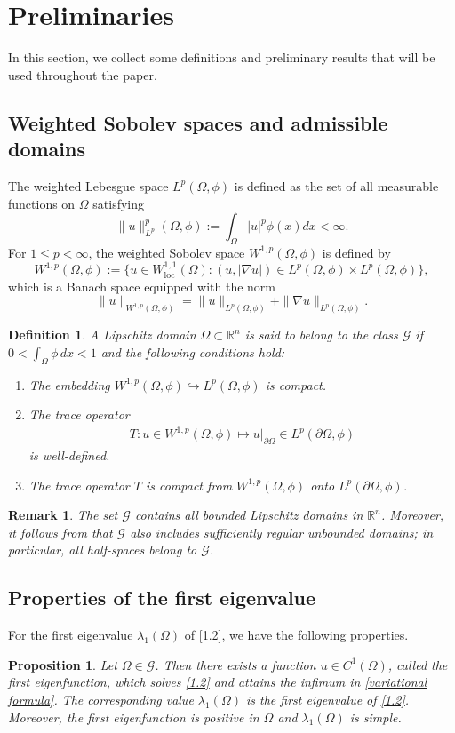 \documentclass[11pt,leqno]{amsart}
\newtheorem{proposition}{Proposition}[section]
\newtheorem{definition}[theorem]{Definition}
\newtheorem{remark}[theorem]{Remark}
\def\l{\lambda}
\def\R{\mathbb{R}}
\numberwithin{equation}{section}
\begin{document}
\section{Preliminaries}\label{sect2}
In this section, we collect some definitions and preliminary results that will be used throughout the paper.
\subsection{Weighted Sobolev spaces and admissible domains}
The weighted Lebesgue space $L^{p}(\Omega, \phi )$ is defined as the set  of all measurable functions on $\Omega$ satisfying 
$$
\|u\|_{L^p}^p(\Omega, \phi ):=\int_{\Omega}|u|^p\phi (x)dx<\infty.$$
 For $1\leq p<\infty$, the weighted Sobolev space $W^{1,p}(\Omega,\phi )$ is defined by
$$W^{1,p}(\Omega,\phi ):=\{u\in W^{1,1}_{\operatorname{loc}}(\Omega): (u,|\nabla u|)\in L^p(\Omega, \phi )\times  L^p(\Omega, \phi )\},$$
which is a Banach space equipped with the norm  
$$\|u\|_{W^{1,p}(\Omega, \phi )}=\|u\|_{L^p(\Omega, \phi )}+\|\nabla u\|_{L^p(\Omega, \phi )}.$$
\begin{definition}\label{Def 2.1}
A Lipschitz domain $\Omega \subset \mathbb{R}^n$ is said to belong to the class $\mathcal{G}$ if $0<\int_\Omega \phi \, dx<1$ and the following conditions hold:
\begin{enumerate}
    \item[(i)] The embedding $W^{1,p}(\Omega, \phi ) \hookrightarrow L^p(\Omega, \phi )$ is compact.
    \item[(ii)] The trace operator
    \begin{align*}
    T : u \in W^{1,p}(\Omega, \phi ) \mapsto u|_{\partial\Omega} \in L^p(\partial\Omega, \phi )
    \end{align*}
    is well-defined.
    \item[(iii)] The trace operator $T$ is compact from $W^{1,p}(\Omega, \phi )$ onto $L^p(\partial\Omega, \phi )$.
\end{enumerate}
\end{definition}

\begin{remark} The set $\mathcal G$ contains all  bounded Lipschitz domains  in $\R^n$. Moreover,  it follows from \cite[Condition 2.1]{Feo13} that $\mathcal G$ also includes sufficiently regular unbounded domains; in particular, all half-spaces belong to $\mathcal G$.
\end{remark}
\subsection{Properties of the first eigenvalue}
For the first eigenvalue $\l_1(\Omega)$ of \eqref{1.2}, we have the following properties.
\begin{proposition}\label{Theorem1}
    Let $\Omega\in \mathcal{G}$. Then there exists a function $u\in C^{1}(\Omega)$, called the first eigenfunction, which solves \eqref{1.2} and attains the infimum in \eqref{variational formula}. The corresponding value $\lambda_1(\Omega)$ is the first eigenvalue of \eqref{1.2}. Moreover,  the first eigenfunction is positive in $\Omega$ and $\lambda_1(\Omega)$ is simple.
\end{proposition}
\end{document}
